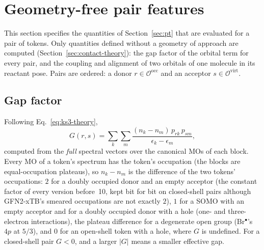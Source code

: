 \documentclass[11pt,a4paper]{article}
\newcommand{\occ}{\mathrm{occ}}
\newcommand{\virt}{\mathrm{virt}}
\begin{document}
\section{Geometry-free pair features}
\label{sec:ks}
This section specifies the quantities of Section~\ref{sec:pt} that are evaluated for a pair of tokens. Only quantities defined without a geometry of approach are computed (Section~\ref{sec:contact-theory}): the gap factor of the orbital term for every pair, and the coupling and alignment of two orbitals of one molecule in its reactant pose. Pairs are ordered: a donor $r\in\mathcal{O}^{\occ}$ and an acceptor $s\in\mathcal{O}^{\virt}$.

\subsection{Gap factor}
Following Eq.~\eqref{eq:ks3-theory},
\begin{equation}
G(r,s)=\sum_{k}\sum_{m}\frac{(n_k-n_m)\,p_{rk}\,p_{sm}}{\epsilon_k-\epsilon_m},
\label{eq:ks3}
\end{equation}
computed from the \emph{full} spectral vectors over the canonical MOs of each block. Every MO of a token's spectrum has the token's occupation (the blocks are equal-occupation plateaus), so $n_k-n_m$ is the difference of the two tokens' occupations: $2$ for a doubly occupied donor and an empty acceptor (the constant factor of every version before~10, kept bit for bit on closed-shell pairs although GFN2-xTB's smeared occupations are not exactly $2$), $1$ for a SOMO with an empty acceptor and for a doubly occupied donor with a hole (one- and three-electron interactions), the plateau difference for a degenerate open group (Br$^\bullet$'s $4p$ at $5/3$), and $0$ for an open-shell token with a hole, where $G$ is undefined. For a closed-shell pair $G<0$, and a larger $|G|$ means a smaller effective gap.
\end{document}

